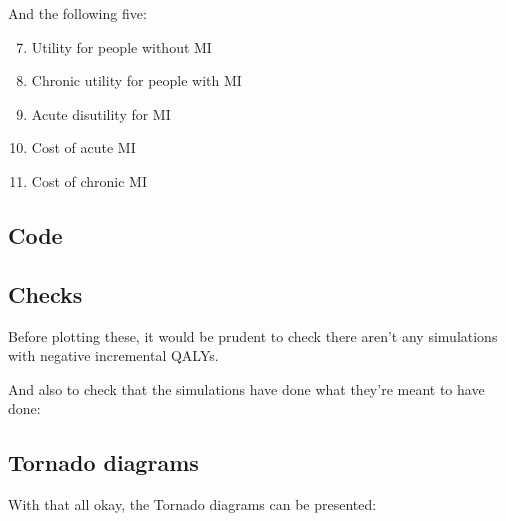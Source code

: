 \documentclass[11pt]{article}
\begin{document}
And the following five:

\begin{enumerate}
\setcounter{enumi}{6}
\item Utility for people without MI
\item Chronic utility for people with MI
\item Acute disutility for MI
\item Cost of acute MI
\item Cost of chronic MI
\end{enumerate}

\subsection{Code}

\color{Blue4}
\begin{stlog}\end{stlog}
\color{black}

\subsection{Checks}

Before plotting these, it would be prudent to check there aren't any simulations 
with negative incremental QALYs.

\color{Blue4}
\begin{stlog}\end{stlog}
\color{black}

And also to check that the simulations have done what they're meant to have done:

\color{Blue4}
\begin{stlog}\end{stlog}
\color{black}

\subsection{Tornado diagrams}

With that all okay, the Tornado diagrams can be presented:
\end{document}
